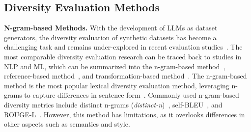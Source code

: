 



\subsection{Diversity Evaluation Methods}
\textbf{N-gram-based Methods.} With the development of LLMs as dataset generators, the diversity evaluation of synthetic datasets has become a challenging task and remains under-explored in recent evaluation studies~\citep{liang2022holistic,AlpacaEval}. The most comparable diversity evaluation research can be traced back to studies in NLP and ML, which can be summarized into the n-gram-based method~\citep{mishra2020dqi}, reference-based method~\citep{heusel2017gans}, and transformation-based method~\citep{lai2020diversity}. The n-gram-based method is the most popular lexical diversity evaluation method, leveraging n-grams to capture differences in sentence form~\citep{yu2024large}. Commonly used n-gram-based diversity metrics include distinct n-grams (\textit{distinct-n})~\citep{song2024scaling}, self-BLEU~\citep{shu2019generating}, and ROUGE-L~\citep{wang2022self,padmakumar2023does}. However, this method has limitations, as it overlooks differences in other aspects such as semantics and style.


